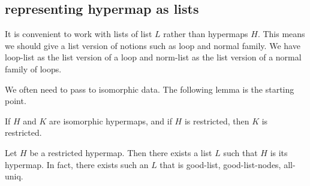 \subsection{representing hypermap as lists}

It is convenient to work with lists of list $L$ rather than hypermaps $H$.  This means
we should give a list version of notions such as loop and normal family.
We have loop-list as the list version of a loop and norm-list as the list
version of  a normal family of loops.  

We often need to pass to isomorphic data.  The following lemma is the starting point.

\begin{lemma}
If $H$ and $K$ are isomorphic hypermaps, and if $H$ is restricted, then $K$ is restricted.
\end{lemma}

\begin{lemma}
Let $H$ be a restricted hypermap.  Then there exists a list $L$ such that $H$ is its hypermap.
In fact, there exists such an $L$ that is good-list, good-list-nodes, all-uniq.
\end{lemma}

